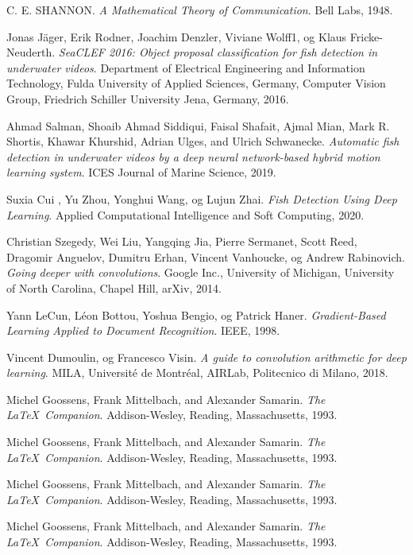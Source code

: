 \documentclass[11ot]{article}
\begin{document}
\begin{thebibliography}{9}
C. E. SHANNON. 
\textit{A Mathematical Theory of Communication}. 
Bell Labs, 1948.

Jonas Jäger, Erik Rodner, Joachim Denzler, Viviane Wolff1, og Klaus Fricke-Neuderth. 
\textit{SeaCLEF 2016: Object proposal classification for fish detection in underwater videos}. 
Department of Electrical Engineering and Information Technology, Fulda University of Applied Sciences, Germany, Computer Vision Group, Friedrich Schiller University Jena, Germany, 2016.

Ahmad Salman, Shoaib Ahmad Siddiqui, Faisal Shafait, Ajmal Mian, Mark R. Shortis, Khawar Khurshid, Adrian Ulges, and Ulrich Schwanecke. 
\textit{Automatic fish detection in underwater videos by a deep neural network-based hybrid motion learning system}. 
ICES Journal of Marine Science, 2019.

Suxia Cui , Yu Zhou, Yonghui Wang, og Lujun Zhai. 
\textit{Fish Detection Using Deep Learning}. 
Applied Computational Intelligence and Soft Computing, 2020.

Christian Szegedy, Wei Liu, Yangqing Jia, Pierre Sermanet, Scott Reed, Dragomir Anguelov, Dumitru Erhan, Vincent Vanhoucke, og Andrew Rabinovich. 
\textit{Going deeper with convolutions}. 
Google Inc., University of Michigan, University of North Carolina, Chapel Hill, arXiv, 2014.

Yann LeCun, Léon Bottou, Yoshua Bengio, og Patrick Haner. 
\textit{Gradient-Based Learning Applied to Document Recognition}. 
IEEE, 1998.

Vincent Dumoulin, og Francesco Visin. 
\textit{A guide to convolution arithmetic for deep learning}. 
MILA, Université de Montréal, AIRLab, Politecnico di Milano, 2018.

Michel Goossens, Frank Mittelbach, and Alexander Samarin. 
\textit{The \LaTeX\ Companion}. 
Addison-Wesley, Reading, Massachusetts, 1993.

Michel Goossens, Frank Mittelbach, and Alexander Samarin. 
\textit{The \LaTeX\ Companion}. 
Addison-Wesley, Reading, Massachusetts, 1993.

Michel Goossens, Frank Mittelbach, and Alexander Samarin. 
\textit{The \LaTeX\ Companion}. 
Addison-Wesley, Reading, Massachusetts, 1993.

Michel Goossens, Frank Mittelbach, and Alexander Samarin. 
\textit{The \LaTeX\ Companion}. 
Addison-Wesley, Reading, Massachusetts, 1993.


\end{thebibliography}
\end{document}
